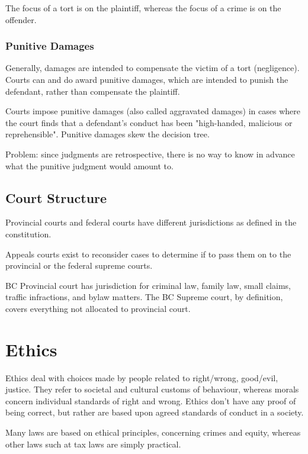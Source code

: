 \documentclass{article}
\begin{document}
The focus of a tort is on the plaintiff, whereas the focus of a crime is on the offender. 


\subsubsection{Punitive Damages}


Generally, damages are intended to compensate the victim of a tort (negligence). Courts can and do award punitive damages, which are intended to punish the defendant, rather than compensate the plaintiff.

Courts impose punitive damages (also called aggravated damages) in cases where the court finds that a defendant's conduct has been "high-handed, malicious or reprehensible". Punitive damages skew the decision tree.

Problem: since judgments are retrospective, there is no way to know in advance what the punitive judgment would amount to.




\subsection{Court Structure}

Provincial courts and federal courts have different jurisdictions as defined in the constitution. 

Appeals courts exist to reconsider cases to determine if to pass them on to the provincial or the federal supreme courts.

BC Provincial court has jurisdiction for criminal law, family law, small claims, traffic infractions, and bylaw matters. The BC Supreme court, by definition, covers everything not allocated to provincial court. 

\section{Ethics}

Ethics deal with choices made by people related to right/wrong, good/evil, justice. They refer to societal and cultural customs of behaviour, whereas morals concern individual standards of right and wrong. Ethics don't have any proof of being correct, but rather are based upon agreed standards of conduct in a society.

Many laws are based on ethical principles, concerning crimes and equity, whereas other laws such at tax laws are simply practical. 
\end{document}
